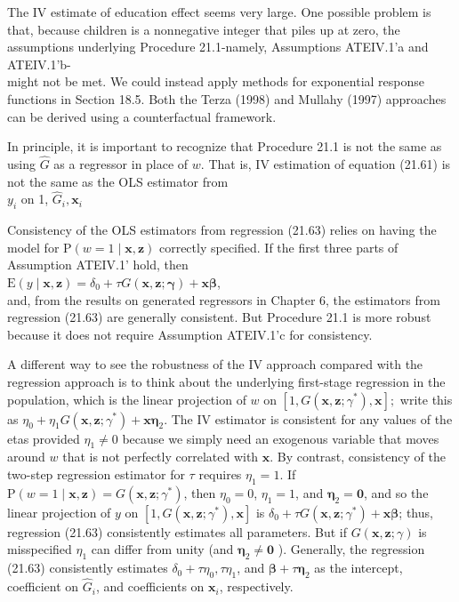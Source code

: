 \documentclass[10pt]{article}
\begin{document}
The IV estimate of education effect seems very large. One possible problem is that, because children is a nonnegative integer that piles up at zero, the assumptions underlying Procedure 21.1-namely, Assumptions ATEIV.1'a and ATEIV.1'b-\\
might not be met. We could instead apply methods for exponential response functions in Section 18.5. Both the Terza (1998) and Mullahy (1997) approaches can be derived using a counterfactual framework.

In principle, it is important to recognize that Procedure 21.1 is not the same as using $\hat{G}$ as a regressor in place of $w$. That is, IV estimation of equation (21.61) is not the same as the OLS estimator from\\
$y_{i}$ on 1, $\hat{G}_{i}, \mathbf{x}_{i}$

Consistency of the OLS estimators from regression (21.63) relies on having the model for $\mathrm{P}(w=1 \mid \mathbf{x}, \mathbf{z})$ correctly specified. If the first three parts of Assumption ATEIV.1' hold, then\\
$\mathrm{E}(y \mid \mathbf{x}, \mathbf{z})=\delta_{0}+\tau G(\mathbf{x}, \mathbf{z} ; \boldsymbol{\gamma})+\mathbf{x} \boldsymbol{\beta}$,\\
and, from the results on generated regressors in Chapter 6, the estimators from regression (21.63) are generally consistent. But Procedure 21.1 is more robust because it does not require Assumption ATEIV.1'c for consistency.

A different way to see the robustness of the IV approach compared with the regression approach is to think about the underlying first-stage regression in the population, which is the linear projection of $w$ on $\left[1, G\left(\mathbf{x}, \mathbf{z} ; \gamma^{*}\right), \mathbf{x}\right] ;$ write this as $\eta_{0}+\eta_{1} G\left(\mathbf{x}, \mathbf{z} ; \gamma^{*}\right)+\mathbf{x} \boldsymbol{\eta}_{2}$. The IV estimator is consistent for any values of the etas provided $\eta_{1} \neq 0$ because we simply need an exogenous variable that moves around $w$ that is not perfectly correlated with $\mathbf{x}$. By contrast, consistency of the two-step regression estimator for $\tau$ requires $\eta_{1}=1$. If $\mathrm{P}(w=1 \mid \mathbf{x}, \mathbf{z})=G\left(\mathbf{x}, \mathbf{z} ; \gamma^{*}\right)$, then $\eta_{0}=0$, $\eta_{1}=1$, and $\boldsymbol{\eta}_{2}=\mathbf{0}$, and so the linear projection of $y$ on $\left[1, G\left(\mathbf{x}, \mathbf{z} ; \gamma^{*}\right), \mathbf{x}\right]$ is $\delta_{0}+ \tau G\left(\mathbf{x}, \mathbf{z} ; \gamma^{*}\right)+\mathbf{x} \boldsymbol{\beta}$; thus, regression (21.63) consistently estimates all parameters. But if $G(\mathbf{x}, \mathbf{z} ; \gamma)$ is misspecified $\eta_{1}$ can differ from unity (and $\boldsymbol{\eta}_{2} \neq \mathbf{0}$ ). Generally, the regression (21.63) consistently estimates $\delta_{0}+\tau \eta_{0}, \tau \eta_{1}$, and $\boldsymbol{\beta}+\tau \boldsymbol{\eta}_{2}$ as the intercept, coefficient on $\hat{G}_{i}$, and coefficients on $\mathbf{x}_{i}$, respectively.
\end{document}
